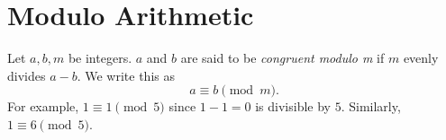\documentclass[11pt]{article}
\theoremstyle{definition}
\newcommand{\fdbox}[2]{\fbox{\sffamily\LARGE\vphantom y#1: \bfseries #2} \par\vspace{1em}} %
\begin{document}
\newcommand{\logo}{%
\begin{minipage}[b]{22em}
\centering\noindent
\\[0.5em]
\begin{minipage}[t][4em][t]{12em} \centering
{\huge \bfseries ${\bf 26^{\text{th}}}$ TJIMO } \\
\textsc{\large Alexandria, Virginia}
\end{minipage}
\end{minipage}
\vspace*{-0.05em}
}
\newcommand{\sevenpoints}{}
\newcommand{\righthead}{\fdbox{Round}{Practice Power Solutions}}




\section{Modulo Arithmetic}
Let $a,b,m$ be integers. $a$ and $b$ are said to be \textit{congruent modulo m}
if $m$ evenly divides $a - b$. We write this as
\[a \equiv b \pmod{m}.\]
For example, $1 \equiv 1 \pmod{5}$ since
$1 - 1 = 0$ is divisible by $5$. Similarly, $1 \equiv 6 \pmod{5}$.
\end{document}
